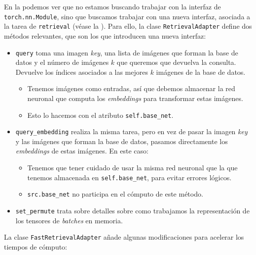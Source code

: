 En la  podemos ver que no estamos buscando trabajar con la interfaz de \lstinline{torch.nn.Module}, sino que buscamos trabajar con una nueva interfaz, asociada a la tarea de \lstinline{retrieval} (véase la ). Para ello, la clase \lstinline{RetrievalAdapter} define dos métodos relevantes, que son los que introducen una nueva interfaz:

\begin{itemize}
	\item \lstinline{query} toma una imagen \textit{key}, una lista de imágenes que forman la base de datos y el número de imágenes $k$ que queremos que devuelva la consulta. Devuelve los índices asociados a las mejores $k$ imágenes de la base de datos.
	      \begin{itemize}
		      \item Tenemos imágenes como entradas, así que debemos almacenar la red neuronal que computa los \textit{embeddings} para transformar estas imágenes.
		      \item Esto lo hacemos con el atributo \lstinline{self.base_net}.
	      \end{itemize}
	\item \lstinline{query_embedding} realiza la misma tarea, pero en vez de pasar la imagen \textit{key} y las imágenes que forman la base de datos, pasamos directamente los \textit{embeddings} de estas imágenes. En este caso:
	      \begin{itemize}
		      \item Tenemos que tener cuidado de usar la misma red neuronal que la que tenemos almacenada en \lstinline{self.base_net}, para evitar errores lógicos.
		      \item \lstinline{src.base_net} no participa en el cómputo de este método.
	      \end{itemize}
	\item \lstinline{set_permute} trata sobre detalles sobre como trabajamos la representación de los tensores de \textit{batches} en memoria.
\end{itemize}

La clase \lstinline{FastRetrievalAdapter} añade algunas modificaciones para acelerar los tiempos de cómputo:

